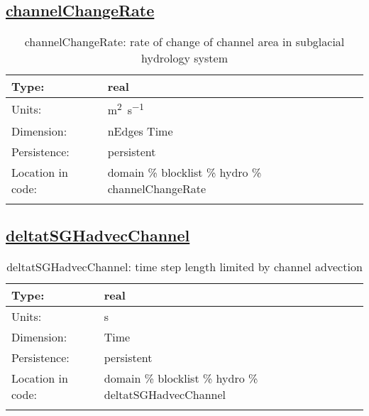 \subsection[channelChangeRate]{\hyperref[sec:var_tab_hydro]{channelChangeRate}}
\label{subsec:var_sec_hydro_channelChangeRate}
\begin{center}
\begin{longtable}{| p{2.0in} | p{4.0in} |}
        \hline 
        Type: & real \\
        \hline 
        Units: & \si{m^{2}.s^{-1}} \\
        \hline 
        Dimension: & nEdges Time \\
        \hline 
        Persistence: & persistent \\
        \hline 
         Location in code: & domain \% blocklist \% hydro \% channelChangeRate \\
         \hline 
    \caption{channelChangeRate: rate of change of channel area in subglacial hydrology system}
\end{longtable}
\end{center}
\subsection[deltatSGHadvecChannel]{\hyperref[sec:var_tab_hydro]{deltatSGHadvecChannel}}
\label{subsec:var_sec_hydro_deltatSGHadvecChannel}
\begin{center}
\begin{longtable}{| p{2.0in} | p{4.0in} |}
        \hline 
        Type: & real \\
        \hline 
        Units: & \si{s} \\
        \hline 
        Dimension: & Time \\
        \hline 
        Persistence: & persistent \\
        \hline 
         Location in code: & domain \% blocklist \% hydro \% deltatSGHadvecChannel \\
         \hline 
    \caption{deltatSGHadvecChannel: time step length limited by channel advection}
\end{longtable}
\end{center}
